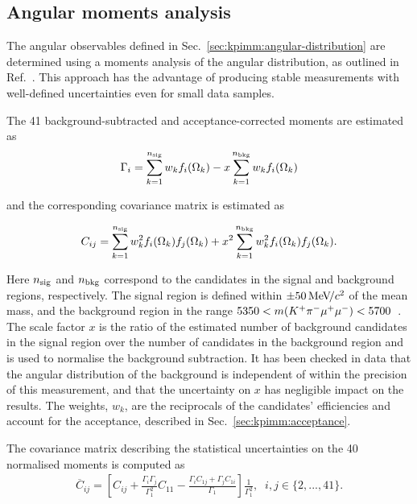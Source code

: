 \subsection{Angular moments analysis}
\label{sec:kpimm:angular-analysis}

The angular observables defined in Sec.~\ref{sec:kpimm:angular-distribution} are determined using a moments analysis of the angular distribution, as outlined in Ref.~\cite{biplab}. This approach has the advantage of producing stable measurements with well-defined uncertainties even for small data samples.

The 41 background-subtracted and acceptance-corrected moments are estimated as
\begin{equation}
 \label{eqn:moments}
\Gamma_i =  \sum_{k=1}^{n_{\rm sig}} w_{k}f_i(\Omega_k)  - x\sum_{k=1}^{n_{\rm bkg}} w_{k}f_i(\Omega_k)\\
\end{equation}

\noindent and the corresponding covariance matrix is estimated as

\begin{equation}
 \label{eqn:covariance}
 C_{ij} = \sum_{k=1}^{n_{\rm sig}} w^{2}_{k}f_i(\Omega_k)f_j(\Omega_k)   + x^2\sum_{k=1}^{n_{\rm bkg}} w^{2}_{k}f_i(\Omega_k)f_j(\Omega_k).
\end{equation}

\noindent Here $n_{\rm sig}$ and $n_{\rm bkg}$ correspond to the candidates in the signal and background regions, respectively. The signal region is defined within $\pm 50{\mathrm{\,Me\kern -0.1em V\!/}c^2}$ of the mean \Bz mass, and the background region in the range $5350<m({{K}^+}{{\pi}^-}{\mu^+}{\mu^-})<5700$~\mevcc.  The scale factor $x$ is the ratio of the estimated number of background candidates in the signal region over the number of candidates in the background region and is used to normalise the background subtraction.
It has been checked in data that the angular distribution of the background is independent of \mkpimm within the precision of this measurement, and that the uncertainty on $x$ has negligible impact on the results.
The weights, $w_{k}$, are the reciprocals of the candidates' efficiencies and account for the acceptance, described in Sec.~\ref{sec:kpimm:acceptance}.

The covariance matrix describing the statistical uncertainties on the 40 normalised moments is computed as
\begin{align}
\label{eqn:red_cov_def}
\overline{C}_{ij} = \left[C_{ij} + \frac{\Gamma_i \Gamma_j}{\Gamma_1^2} C_{11} - \frac{\Gamma_i C_{1j} + \Gamma_j C_{1i}}{\Gamma_1}\right] \frac{1}{\Gamma_1^2},  \;\; i,j \in \{2,...,41\}.
\end{align}

